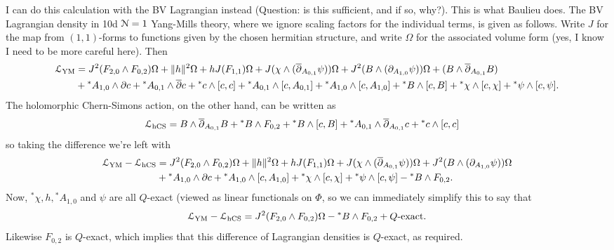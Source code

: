 \documentclass[10pt, oneside]{article}
\newcommand{\st}[1]{{}^*{#1}}
\begin{document}
\begin{example}[10d $\mc N=1$ Super Yang-Mills]
I can do this calculation with the BV Lagrangian instead (Question: is this sufficient, and if so, why?).  This is what Baulieu does.  The BV Lagrangian density in 10d $\mc N=1$ Yang-Mills theory, where we ignore scaling factors for the individual terms, is given as follows.  Write $J$ for the map from $(1,1)$-forms to functions given by the chosen hermitian structure, and write $\Omega$ for the associated volume form (yes, I know I need to be more careful here).  Then
\begin{align*}
\LL_{\mr{YM}} &= J^2(F_{2, 0}\wedge F_{0,2})\Omega + \|h\|^2\Omega + h J(F_{1,1}) \Omega + J( \chi \wedge (\ol \dd_{A_{0,1}} \psi)) \Omega + J^2(B \wedge (\dd_{A_{1,0}} \psi)) \Omega + (B \wedge \ol \dd_{A_{0,1}} B) \\
&+ \st{A_{1, 0}}\wedge \partial c + \st{A_{0, 1}}\wedge \overline{\partial} c + \st{c}\wedge [c, c] + \st{A_{0, 1}}\wedge [c, A_{0, 1}] + \st{A_{1, 0}}\wedge [c, A_{1, 0}] + \st{B}\wedge [c, B] + \st{\chi}\wedge [c, \chi] 
+ \st{\psi}\wedge [c, \psi].
\end{align*}
The holomorphic Chern-Simons action, on the other hand, can be written as
\begin{align*}
\LL_{\mr{hCS}} &= B \wedge \ol \dd_{A_{0,1}} B + \st B \wedge F_{0,2} + \st B \wedge [c,B] + \st A_{0,1} \wedge \ol \dd_{A_{0,1}}c + \st c \wedge [c,c]
\end{align*}
so taking the difference we're left with
\begin{align*}
\LL_{\mr{YM}} - \LL_{\mr{hCS}} &= J^2(F_{2, 0}\wedge F_{0,2})\Omega + \|h\|^2\Omega + h J(F_{1,1}) \Omega + J( \chi \wedge (\ol \dd_{A_{0,1}} \psi)) \Omega + J^2(B \wedge (\dd_{A_{1,0}} \psi)) \Omega \\
&+ \st{A_{1, 0}}\wedge \partial c    + \st{A_{1, 0}}\wedge [c, A_{1, 0}]  + \st{\chi}\wedge [c, \chi] 
+ \st{\psi}\wedge [c, \psi] - \st B \wedge F_{0,2}.
\end{align*}
Now, $\st \chi, h, \st A_{1,0}$ and $\psi$ are all $Q$-exact (viewed as linear functionals on $\Phi$, so we can immediately simplify this to say that
\[ \LL_{\mr{YM}} - \LL_{\mr{hCS}} = J^2(F_{2, 0}\wedge F_{0,2})\Omega - \st B \wedge F_{0,2}  + Q\text{-exact}.\]
Likewise $F_{0,2}$ is $Q$-exact, which implies that this difference of Lagrangian densities is $Q$-exact, as required.
\end{example}
\end{document}
